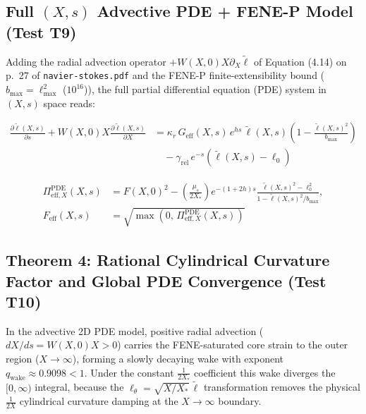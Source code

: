 \documentclass[12pt,a4paper]{article}
\begin{document}
\subsection{Full $(X, s)$ Advective PDE + FENE-P Model (Test T9)}

Adding the radial advection operator $+W(X, 0) X \partial_X \tilde{\ell}$ of Equation (4.14) on p.\ 27 of \texttt{navier-stokes.pdf} and the FENE-P finite-extensibility bound ($b_{\max} = \ell_{\max}^2$ ($10^{16}$)), the full partial differential equation (PDE) system in $(X, s)$ space reads:

\begin{equation}
\begin{split}
\frac{\partial \tilde{\ell}(X, s)}{\partial s} + W(X, 0) X \frac{\partial \tilde{\ell}(X, s)}{\partial X} &= \kappa_r \, G_{\mathrm{eff}}(X, s) \, e^{h s} \, \tilde{\ell}(X, s) \left( 1 - \frac{\tilde{\ell}(X, s)^2}{b_{\max}} \right) \\
&\quad - \gamma_{\mathrm{rel}} \, e^{-s} \left( \tilde{\ell}(X, s) - \ell_0 \right)
\end{split}
\end{equation}

\begin{equation}
\begin{split}
\Pi_{\mathrm{eff}, X}^{\mathrm{PDE}}(X, s) &= F(X, 0)^2 - \left( \frac{\mu_s}{2 X_*} \right) e^{-(1+2h)s} \frac{\tilde{\ell}(X, s)^2 - \ell_0^2}{1 - \tilde{\ell}(X, s)^2 / b_{\max}}, \\
F_{\mathrm{eff}}(X, s) &= \sqrt{\max\left( 0, \, \Pi_{\mathrm{eff}, X}^{\mathrm{PDE}}(X, s) \right)}
\end{split}
\end{equation}

\subsection{Theorem 4: Rational Cylindrical Curvature Factor and Global PDE Convergence (Test T10)}

In the advective 2D PDE model, positive radial advection ($dX/ds = W(X,0)X > 0$) carries the FENE-saturated core strain to the outer region ($X \to \infty$), forming a slowly decaying wake with exponent $q_{\mathrm{wake}} \approx 0.9098 < 1$. Under the constant $\frac{1}{2X_*}$ coefficient this wake diverges the $[0,\infty)$ integral, because the $\ell_\theta = \sqrt{X/X_*}\,\tilde{\ell}$ transformation removes the physical $\frac{1}{2X}$ cylindrical curvature damping at the $X \to \infty$ boundary.
\end{document}
